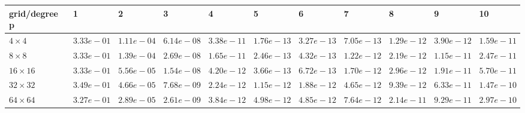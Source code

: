 \begin{tabular}{lllllllllll}
\hline
 grid/degree p   & 1          & 2          & 3          & 4          & 5          & 6          & 7          & 8          & 9          & 10         \\
\hline
 $4 \times 4$    & $3.33e-01$ & $1.11e-04$ & $6.14e-08$ & $3.38e-11$ & $1.76e-13$ & $3.27e-13$ & $7.05e-13$ & $1.29e-12$ & $3.90e-12$ & $1.59e-11$ \\
 $8 \times 8$    & $3.33e-01$ & $1.39e-04$ & $2.69e-08$ & $1.65e-11$ & $2.46e-13$ & $4.32e-13$ & $1.22e-12$ & $2.19e-12$ & $1.15e-11$ & $2.47e-11$ \\
 $16 \times 16$  & $3.33e-01$ & $5.56e-05$ & $1.54e-08$ & $4.20e-12$ & $3.66e-13$ & $6.72e-13$ & $1.70e-12$ & $2.96e-12$ & $1.91e-11$ & $5.70e-11$ \\
 $32 \times 32$  & $3.49e-01$ & $4.66e-05$ & $7.68e-09$ & $2.24e-12$ & $1.15e-12$ & $1.88e-12$ & $4.65e-12$ & $9.39e-12$ & $6.33e-11$ & $1.47e-10$ \\
 $64 \times 64$  & $3.27e-01$ & $2.89e-05$ & $2.61e-09$ & $3.84e-12$ & $4.98e-12$ & $4.85e-12$ & $7.64e-12$ & $2.14e-11$ & $9.29e-11$ & $2.97e-10$ \\
\hline
\end{tabular}